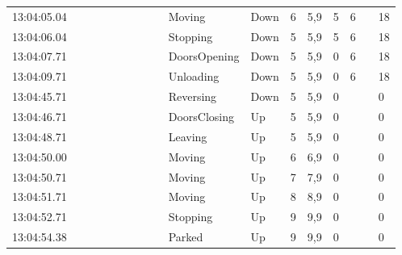 \documentclass{UoYCSproject}
\begin{document}
\begin{appendices}
\begin{landscape}
\begin{longtable}{l || l | l | l | l | l | l | l | l || l | l | l | l | l | l | l | l}
	13:04:05.04 &  &  &  &  &  &  &  &  & Moving & Down & 6 & 5,9 & 5 & 6 &  & 18 \\
	13:04:06.04 &  &  &  &  &  &  &  &  & Stopping & Down & 5 & 5,9 & 5 & 6 &  & 18 \\
	13:04:07.71 &  &  &  &  &  &  &  &  & DoorsOpening & Down & 5 & 5,9 & 0 & 6 &  & 18 \\
	13:04:09.71 &  &  &  &  &  &  &  &  & Unloading & Down & 5 & 5,9 & 0 & 6 &  & 18 \\
	13:04:45.71 &  &  &  &  &  &  &  &  & Reversing & Down & 5 & 5,9 & 0 &  &  & 0 \\
	13:04:46.71 &  &  &  &  &  &  &  &  & DoorsClosing & Up & 5 & 5,9 & 0 &  &  & 0 \\
	13:04:48.71 &  &  &  &  &  &  &  &  & Leaving & Up & 5 & 5,9 & 0 &  &  & 0 \\
	13:04:50.00 &  &  &  &  &  &  &  &  & Moving & Up & 6 & 6,9 & 0 &  &  & 0 \\
	13:04:50.71 &  &  &  &  &  &  &  &  & Moving & Up & 7 & 7,9 & 0 &  &  & 0 \\
	13:04:51.71 &  &  &  &  &  &  &  &  & Moving & Up & 8 & 8,9 & 0 &  &  & 0 \\
	13:04:52.71 &  &  &  &  &  &  &  &  & Stopping & Up & 9 & 9,9 & 0 &  &  & 0 \\
	13:04:54.38 &  &  &  &  &  &  &  &  & Parked & Up & 9 & 9,9 & 0 &  &  & 0
\end{longtable}
\end{landscape}
\end{appendices}
\end{document}
